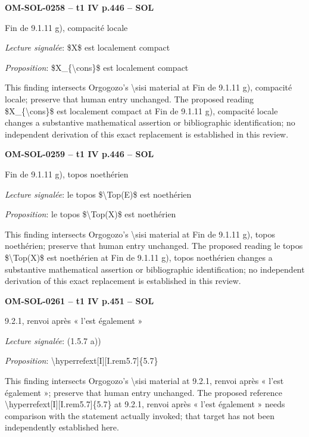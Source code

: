 \par\noindent\textbf{OM-SOL-0258 -- t1 IV p.446 -- SOL}\par
Fin de 9.1.11 g), compacité locale\par
\emph{Lecture signalée}: \$X\$ est localement compact\par
\emph{Proposition}: \$X\_\{\textbackslash{}cons\}\$ est localement compact\par
This finding intersects Orgogozo's \textbackslash{}sisi material at Fin de 9.1.11 g), compacité locale; preserve that human entry unchanged. The proposed reading \$X\_\{\textbackslash{}cons\}\$ est localement compact at Fin de 9.1.11 g), compacité locale changes a substantive mathematical assertion or bibliographic identification; no independent derivation of this exact replacement is established in this review.\par
\par\noindent\textbf{OM-SOL-0259 -- t1 IV p.446 -- SOL}\par
Fin de 9.1.11 g), topos noethérien\par
\emph{Lecture signalée}: le topos \$\textbackslash{}Top(E)\$ est noethérien\par
\emph{Proposition}: le topos \$\textbackslash{}Top(X)\$ est noethérien\par
This finding intersects Orgogozo's \textbackslash{}sisi material at Fin de 9.1.11 g), topos noethérien; preserve that human entry unchanged. The proposed reading le topos \$\textbackslash{}Top(X)\$ est noethérien at Fin de 9.1.11 g), topos noethérien changes a substantive mathematical assertion or bibliographic identification; no independent derivation of this exact replacement is established in this review.\par
\par\noindent\textbf{OM-SOL-0261 -- t1 IV p.451 -- SOL}\par
9.2.1, renvoi après « l'est également »\par
\emph{Lecture signalée}: (1.5.7 a))\par
\emph{Proposition}: \textbackslash{}hyperrefext[I][I.rem5.7]\{5.7\}\par
This finding intersects Orgogozo's \textbackslash{}sisi material at 9.2.1, renvoi après « l'est également »; preserve that human entry unchanged. The proposed reference \textbackslash{}hyperrefext[I][I.rem5.7]\{5.7\} at 9.2.1, renvoi après « l'est également » needs comparison with the statement actually invoked; that target has not been independently established here.\par
